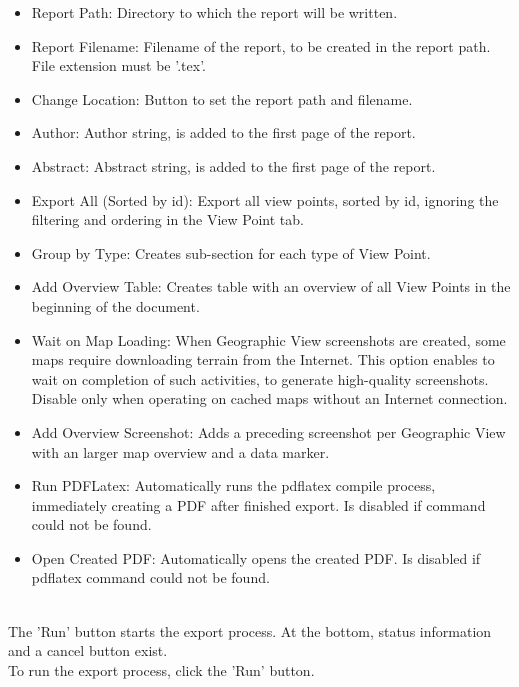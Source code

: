\begin{itemize}  
\item Report Path: Directory to which the report will be written.
\item Report Filename: Filename of the report, to be created in the report path. File extension must be '.tex'.
\item Change Location: Button to set the report path and filename.
\item Author: Author string, is added to the first page of the report.
\item Abstract: Abstract string, is added to the first page of the report.
\item Export All (Sorted by id): Export all view points, sorted by id, ignoring the filtering and ordering in the View Point tab.
\item Group by Type: Creates sub-section for each type of View Point.
\item Add Overview Table: Creates table with an overview of all View Points in the beginning of the document. 
\item Wait on Map Loading: When Geographic View screenshots are created, some maps require downloading terrain from the Internet.  This option enables to wait on completion of such activities, to generate high-quality screenshots. Disable only when operating on cached maps without an Internet connection.
\item Add Overview Screenshot: Adds a preceding screenshot per Geographic View with an larger map overview and a data marker.
\item Run PDFLatex: Automatically runs the pdflatex compile process, immediately creating a PDF after finished export. Is disabled if command could not be found.
\item Open Created PDF: Automatically opens the created PDF. Is disabled if pdflatex command could not be found.
\end{itemize}
\ \\

The 'Run' button starts the export process. At the bottom, status information and a cancel button exist. \\

To run the export process, click the 'Run' button.

